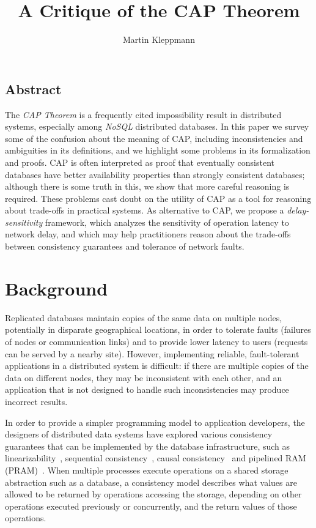 \documentclass[a4paper,twocolumn,10pt]{article}
\begin{document}
\sloppy
\date{} %
\title{A Critique of the CAP Theorem}
\author{Martin Kleppmann}
\maketitle

\subsection*{Abstract}

The \emph{CAP Theorem} is a frequently cited impossibility result in distributed systems, especially
among \emph{NoSQL} distributed databases. In this paper we survey some of the confusion about the
meaning of CAP, including inconsistencies and ambiguities in its definitions, and we highlight some
problems in its formalization and proofs. CAP is often interpreted as proof that eventually
consistent databases have better availability properties than strongly consistent databases;
although there is some truth in this, we show that more careful reasoning is required. These
problems cast doubt on the utility of CAP as a tool for reasoning about trade-offs in practical
systems. As alternative to CAP, we propose a \emph{delay-sensitivity} framework, which analyzes the
sensitivity of operation latency to network delay, and which may help practitioners reason about the
trade-offs between consistency guarantees and tolerance of network faults.


\section{Background}

Replicated databases maintain copies of the same data on multiple nodes, potentially in disparate
geographical locations, in order to tolerate faults (failures of nodes or communication links) and
to provide lower latency to users (requests can be served by a nearby site). However, implementing
reliable, fault-tolerant applications in a distributed system is difficult: if there are multiple
copies of the data on different nodes, they may be inconsistent with each other, and an application
that is not designed to handle such inconsistencies may produce incorrect results.

In order to provide a simpler programming model to application developers, the designers of
distributed data systems have explored various consistency guarantees that can be implemented by the
database infrastructure, such as linearizability~\cite{Herlihy1990jq}, sequential
consistency~\cite{Lamport1979ky}, causal consistency~\cite{Ahamad1995gl} and pipelined RAM
(PRAM)~\cite{Lipton1988uh}. When multiple processes execute operations on a shared storage
abstraction such as a database, a consistency model describes what values are allowed to be returned
by operations accessing the storage, depending on other operations executed previously or
concurrently, and the return values of those operations.
\end{document}
